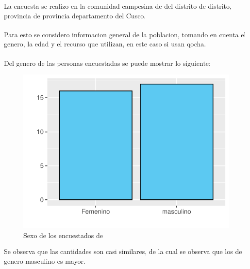 \documentclass[12pt]{article}\usepackage[]{graphicx}\usepackage[]{xcolor}
\makeatletter
\def\maxwidth{ %
  \ifdim\Gin@nat@width>\linewidth
    \linewidth
  \else
    \Gin@nat@width
  \fi
}
\newenvironment{knitrout}{}{} %
\makeatother
\begin{document}

\tableofcontents
\newpage
\listoftables
\newpage
\listoffigures
\newpage

	La encuesta se realizo en la comunidad campesina de \comunidad\- del distrito de distrito, provincia de provincia departamento del Cusco.\\
	\\
	Para esto se considero informacion general de la poblacion, tomando en cuenta el genero, la edad y el recurso que utilizan, en este caso si usan qocha.\\
	\\
	Del genero de las personas encuestadas se puede mostrar lo siguiente:
	\begin{figure}[H]
	\centering
\begin{knitrout}
\color{fgcolor}
\includegraphics[width=\maxwidth]{figure/uno-1} 
\end{knitrout}
	\caption{Sexo de los encuestados de \comunidad}
	\end{figure}
	Se observa que las cantidades son casi similares, de la cual se observa que los de genero masculino es mayor.
\end{document}
